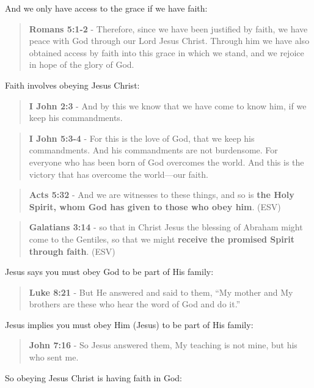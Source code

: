 \documentclass[11pt]{article}
\begin{document}
And we only have access to the grace if we have faith:

\begin{quote}
\textbf{Romans 5:1-2} - Therefore, since we have been justified by faith, we have peace with God through our Lord Jesus Christ. Through him we have also obtained access by faith into this grace in which we stand, and we rejoice in hope of the glory of God.
\end{quote}

Faith involves obeying Jesus Christ:

\begin{quote}
\textbf{I John 2:3} - And by this we know that we have come to know him, if we keep his commandments.
\end{quote}

\begin{quote}
\textbf{I John 5:3-4} - For this is the love of God, that we keep his commandments. And his commandments are not burdensome. For everyone who has been born of God overcomes the world. And this is the victory that has overcome the world—our faith.
\end{quote}

\begin{quote}
\textbf{Acts 5:32} - And we are witnesses to these things, and so is \textbf{the Holy Spirit, whom God has given to those who obey him}. (ESV)
\end{quote}

\begin{quote}
\textbf{Galatians 3:14} - so that in Christ Jesus the blessing of Abraham might come to the Gentiles, so that we might \textbf{receive the promised Spirit through faith}. (ESV)
\end{quote}

Jesus says you must obey God to be part of His family:

\begin{quote}
\textbf{Luke 8:21} - But He answered and said to them, “My mother and My brothers are these who hear the word of God and do it.”
\end{quote}

Jesus implies you must obey Him (Jesus) to be part of His family:

\begin{quote}
\textbf{John 7:16} - So Jesus answered them, My teaching is not mine, but his who sent me.
\end{quote}

So obeying Jesus Christ is having faith in God:
\end{document}

